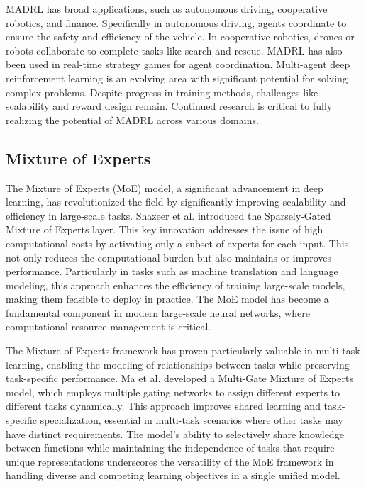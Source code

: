 \documentclass[sigconf]{aamas}
\begin{document}
MADRL has broad applications, such as autonomous driving, cooperative robotics, and finance. Specifically in autonomous driving, agents coordinate to ensure the safety and efficiency of the vehicle. In cooperative robotics, drones or robots collaborate to complete tasks like search and rescue. MADRL has also been used in real-time strategy games for agent coordination. Multi-agent deep reinforcement learning is an evolving area with significant potential for solving complex problems. Despite progress in training methods, challenges like scalability and reward design remain. Continued research is critical to fully realizing the potential of MADRL across various domains.

\subsection{Mixture of Experts}
The Mixture of Experts (MoE) model, a significant advancement in deep learning, has revolutionized the field by significantly improving scalability and efficiency in large-scale tasks. Shazeer et al. \cite{shazeer2017outrageously} introduced the Sparsely-Gated Mixture of Experts layer. This key innovation addresses the issue of high computational costs by activating only a subset of experts for each input. This not only reduces the computational burden but also maintains or improves performance. Particularly in tasks such as machine translation and language modeling, this approach enhances the efficiency of training large-scale models, making them feasible to deploy in practice. The MoE model has become a fundamental component in modern large-scale neural networks, where computational resource management is critical.

The Mixture of Experts framework has proven particularly valuable in multi-task learning, enabling the modeling of relationships between tasks while preserving task-specific performance. Ma et al. \cite{ma2018modeling} developed a Multi-Gate Mixture of Experts model, which employs multiple gating networks to assign different experts to different tasks dynamically. This approach improves shared learning and task-specific specialization, essential in multi-task scenarios where other tasks may have distinct requirements. The model's ability to selectively share knowledge between functions while maintaining the independence of tasks that require unique representations underscores the versatility of the MoE framework in handling diverse and competing learning objectives in a single unified model.
\end{document}
